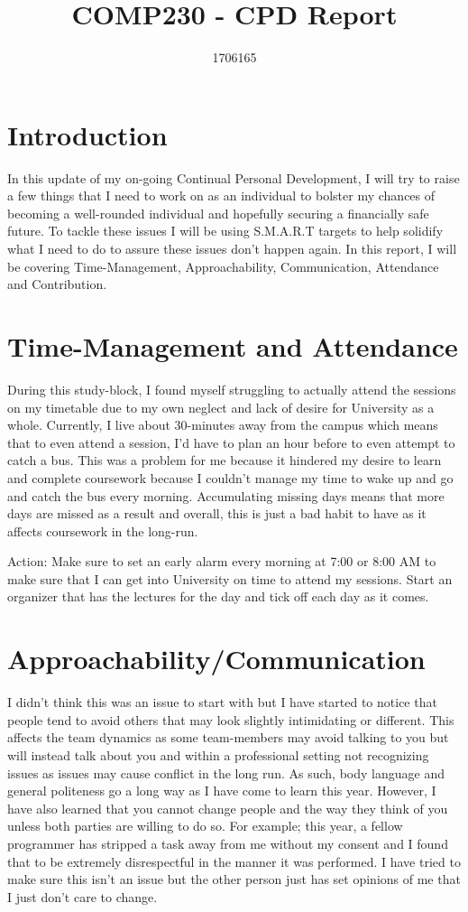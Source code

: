 \documentclass{scrartcl}
\title{COMP230 - CPD Report}
\author{1706165}
\begin{document}
\maketitle

\section{Introduction}
In this update of my on-going Continual Personal Development, I will try to raise a few things that I need to work on as an individual to bolster my chances of becoming a well-rounded individual and hopefully securing a financially safe future. To tackle these issues I will be using S.M.A.R.T targets to help solidify what I need to do to assure these issues don't happen again. In this report, I will be covering Time-Management, Approachability, Communication, Attendance and Contribution.


\section{Time-Management and Attendance}
During this study-block, I found myself struggling to actually attend the sessions on my timetable due to my own neglect and lack of desire for University as a whole. Currently, I live about 30-minutes away from the campus which means that to even attend a session, I'd have to plan an hour before to even attempt to catch a bus. This was a problem for me because it hindered my desire to learn and complete coursework because I couldn't manage my time to wake up and go and catch the bus every morning. Accumulating missing days means that more days are missed as a result and overall, this is just a bad habit to have as it affects coursework in the long-run.

Action: Make sure to set an early alarm every morning at 7:00 or 8:00 AM to make sure that I can get into University on time to attend my sessions. Start an organizer that has the lectures for the day and tick off each day as it comes. 


\section{Approachability/Communication}
I didn't think this was an issue to start with but I have started to notice that people tend to avoid others that may look slightly intimidating or different. This affects the team dynamics as some team-members may avoid talking to you but will instead talk about you and within a professional setting not recognizing issues as issues may cause conflict in the long run. As such, body language and general politeness go a long way as I have come to learn this year. However, I have also learned that you cannot change people and the way they think of you unless both parties are willing to do so. For example; this year, a fellow programmer has stripped a task away from me without my consent and I found that to be extremely disrespectful in the manner it was performed. I have tried to make sure this isn't an issue but the other person just has set opinions of me that I just don't care to change. 
\end{document}

